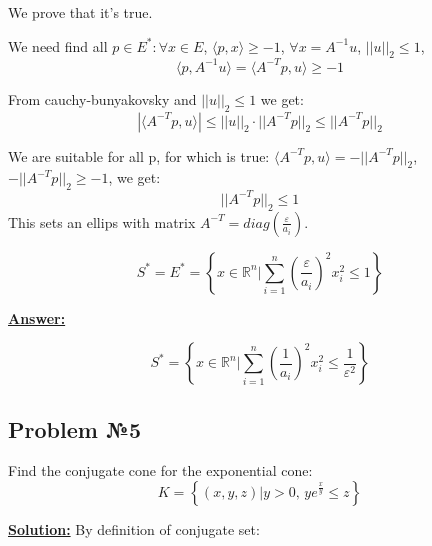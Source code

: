 We prove that it's true. 

We need find all $p \in E^* : \forall x \in E$, $\langle p, x \rangle \geq -1$, $\forall x = A^{-1}u$, $||u||_2 \leq 1$, 
\begin{equation*}
\langle p, A^{-1}u \rangle = \langle A^{-T}p, u \rangle \geq -1    
\end{equation*}

From cauchy-bunyakovsky and $||u||_2 \leq 1$ we get:
\begin{equation*}
    |\langle A^{-T}p, u \rangle|\leq ||u||_2 \cdot ||A^{-T}p||_2 \leq ||A^{-T}p||_2 
\end{equation*}

We are suitable for all p, for which is true: $\langle A^{-T}p, u \rangle = - ||A^{-T}p||_2$,
$-||A^{-T}p||_2 \geq -1$, we get:
\begin{equation*}
    ||A^{-T}p||_2 \leq 1
\end{equation*}
This sets an ellips with matrix $A^{-T} = diag(\frac{\varepsilon}{a_i})$.

\begin{equation*}
    S^* = E^* = \left\{ x \in \mathds{R}^n | \sum\limits_{i=1}^n (\frac{\varepsilon}{a_i})^2 x_i^2 \leq 1 \right\}
\end{equation*}

\underline{\textbf{Answer:}}

\begin{equation*}
    S^* = \left\{ x \in \mathds{R}^n | \sum\limits_{i=1}^n (\frac{1}{a_i})^2 x_i^2 \leq \frac{1}{\varepsilon^2} \right\}
\end{equation*}


\subsection{Problem №5}
Find the conjugate cone for the exponential cone:
\begin{equation*}
    K = \left\{ (x, y, z) | y > 0\text{, } ye^{\frac{x}{y}} \leq z \right\}
\end{equation*}

\underline{\textbf{Solution:}}
By definition of conjugate set: 

